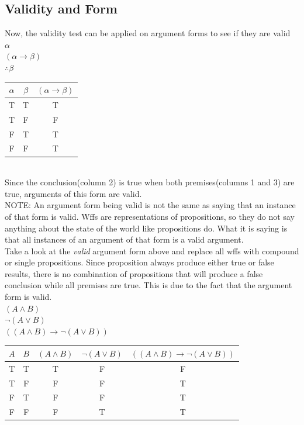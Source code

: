 \documentclass[]{article}
\begin{document}
\subsection{Validity and Form}
Now, the validity test can be applied on argument forms to see if they are valid\\
$\alpha$\\
$(\alpha \rightarrow \beta)$\\
$\therefore \beta$\vspace{5pt}\\
\begin{tabular}{|c|c|c|}
	\hline
	$\alpha$ & $\beta$ & $(\alpha \rightarrow \beta)$\\
	\hline
	T & T & T\\
	T & F & F\\
	F & T & T\\
	F & F & T\\
	\hline
\end{tabular}\vspace{5pt}\\
Since the conclusion(column 2) is true when both premises(columns 1 and 3) are true, arguments of this form are valid.\vspace{5pt}\\
NOTE: An argument form being valid is not the same as saying that an instance of that form is valid. Wffs are representations of propositions, so they do not say anything about the state of the world like propositions do. What it is saying is that all instances of an argument of that form is a valid argument.\vspace{5pt}\\
Take a look at the \textit{valid} argument form above and replace all wffs with compound or single propositions. Since proposition always produce either true or false results, there is no combination of propositions that will produce a false conclusion while all premises are true. This is due to the fact that the argument form is valid.\vspace{5pt}\\
$(A \wedge B)$\\
$\neg(A \vee B)$\\
$((A \wedge B)\rightarrow \neg(A \vee B))$\vspace{5pt}\\
\begin{tabular}{|c|c|c|c|c|}
	\hline
	$A$ & $B$ & $(A \wedge B)$ & $\neg(A \vee B)$ & $((A \wedge B)\rightarrow \neg(A \vee B))$\\
	\hline
	T & T & T & F & F\\
	T & F & F & F & T\\
	F & T & F & F & T\\
	F & F & F & T & T\\
	\hline
\end{tabular}\vspace{5pt}\\
\end{document}
